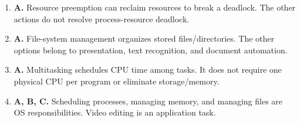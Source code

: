 \begin{enumerate}[label=\textbf{Q\arabic*.}, leftmargin=*]
\item \textbf{A.} Resource preemption can reclaim resources to break a deadlock. The other actions do not resolve process-resource deadlock.

\item \textbf{A.} File-system management organizes stored files/directories. The other options belong to presentation, text recognition, and document automation.

\item \textbf{A.} Multitasking schedules CPU time among tasks. It does not require one physical CPU per program or eliminate storage/memory.

\item \textbf{A, B, C.} Scheduling processes, managing memory, and managing files are OS responsibilities. Video editing is an application task.

\end{enumerate}
